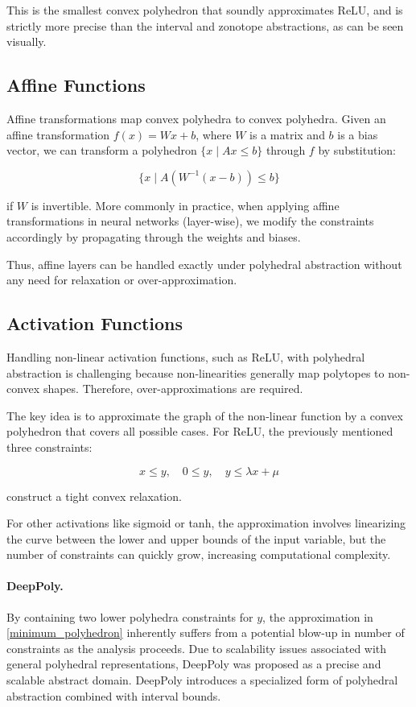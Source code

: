 \documentclass[oneside,11pt,dvipsnames]{book}
\begin{document}
This is the smallest convex polyhedron that soundly approximates ReLU, and is strictly more precise than the interval and zonotope abstractions, as can be seen visually.

\subsection{Affine Functions}

Affine transformations map convex polyhedra to convex polyhedra.  
Given an affine transformation \(f(x) = Wx + b\), where \(W\) is a matrix and \(b\) is a bias vector, we can transform a polyhedron \(\{x \mid A x \leq b\}\) through \(f\) by substitution:

\[
\{x \mid A (W^{-1}(x - b)) \leq b\}
\]

if \(W\) is invertible. More commonly in practice, when applying affine transformations in neural networks (layer-wise), we modify the constraints accordingly by propagating through the weights and biases.

Thus, affine layers can be handled exactly under polyhedral abstraction without any need for relaxation or over-approximation.

\subsection{Activation Functions}

Handling non-linear activation functions, such as ReLU, with polyhedral abstraction is challenging because non-linearities generally map polytopes to non-convex shapes. Therefore, over-approximations are required.

The key idea is to approximate the graph of the non-linear function by a convex polyhedron that covers all possible cases. For ReLU, the previously mentioned three constraints:

\begin{equation}\label{minimum_polyhedron}
x \leq y, \quad 0 \leq y, \quad y \leq \lambda x + \mu
\end{equation}


construct a tight convex relaxation.

For other activations like sigmoid or tanh, the approximation involves linearizing the curve between the lower and upper bounds of the input variable, but the number of constraints can quickly grow, increasing computational complexity.

\paragraph{DeepPoly.}  
By containing two lower polyhedra constraints for \(y\), the approximation in \ref{minimum_polyhedron} inherently suffers from a potential blow-up in number of constraints as the analysis proceeds. Due to scalability issues associated with general polyhedral representations, DeepPoly \cite{singh2019abstract} was proposed as a precise and scalable abstract domain. DeepPoly introduces a specialized form of polyhedral abstraction combined with interval bounds. 
\end{document}
